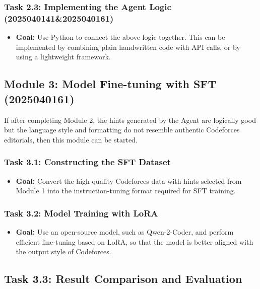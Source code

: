 \documentclass{article}
\begin{document}
\subsubsection*{Task 2.3: Implementing the Agent Logic (2025040141\&2025040161)}

\begin{itemize}
    \item \textbf{Goal:} Use Python to connect the above logic together. This can be implemented by combining plain handwritten code with API calls, or by using a lightweight framework.
\end{itemize}

\subsection*{Module 3: Model Fine-tuning with SFT (2025040161)}


If after completing Module 2, the hints generated by the Agent are logically good but the language style and formatting do not resemble authentic Codeforces editorials, then this module can be started.

\subsubsection*{Task 3.1: Constructing the SFT Dataset}

\begin{itemize}
    \item \textbf{Goal:} Convert the high-quality Codeforces data with hints selected from Module 1 into the instruction-tuning format required for SFT training.
\end{itemize}

\subsubsection*{Task 3.2: Model Training with LoRA}

\begin{itemize}
    \item \textbf{Goal:} Use an open-source model, such as Qwen-2-Coder, and perform efficient fine-tuning based on LoRA, so that the model is better aligned with the output style of Codeforces.
\end{itemize}

\subsection*{Task 3.3: Result Comparison and Evaluation}
\end{document}
